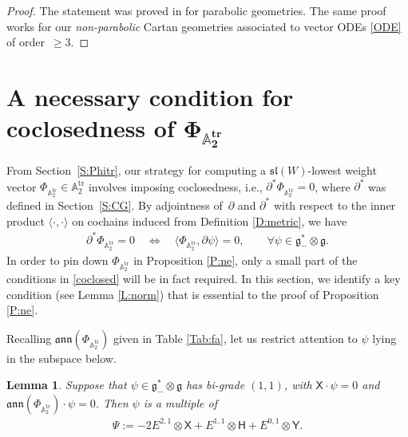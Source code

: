 \documentclass[10pt,a4paper]{amsart}
\newcommand\tensor{\otimes}
\DeclareMathOperator{\tr}{tr}
\newcommand{\g}{\mathfrak{g}}
\newcommand\fann{\mathfrak{ann}}
\newcommand\fg{\mathfrak{g}}
\newcommand\fsl{\mathfrak{sl}}
\newcommand\bbA{\mathbb{A}}
\newcommand\sfX{\mathsf{X}}
\newcommand\sfH{\mathsf{H}}
\newcommand\sfY{\mathsf{Y}}
\numberwithin{equation}{section}
\newtheorem{Lemma}[Theorem]{Lemma}
\begin{document}
\begin{proof}
The statement was proved in \cite[Theorem~3.1.12]{CS2009} for parabolic geometries. The same proof works for our {\em non-parabolic} Cartan geometries associated to vector ODEs \eqref{ODE} of order~${\ge 3}$.
\end{proof}

\section[A necessary condition for coclosedness of Phi\_\{A\_2\^{}\{tr\}\}]{A necessary condition for coclosedness of $\boldsymbol{\Phi_{\bbA_2^{\tr}}}$}\label{S:coclosed}

 From Section~\ref{S:Phitr}, our strategy for computing a $\fsl(W)$-lowest weight vector $\Phi_{\bbA_2^{\tr}} \in \bbA_2^{\tr}$ involves imposing coclosedness, i.e., $\partial^* \Phi_{\bbA_2^{\tr}} = 0$, where $\partial^*$ was defined in Section~\ref{S:CG}. By adjointness of~$\partial$ and $\partial^*$ with respect to the inner product $\langle \cdot, \cdot \rangle$ on cochains induced from Definition \ref{D:metric}, we have
\begin{align}\label{coclosed}
\partial^\ast \Phi_{\bbA_2^{\tr}} = 0 \quad \iff \quad \big\langle \Phi_{\bbA_2^{\tr}},
\partial \psi \big\rangle = 0, \qquad \forall \psi \in \g^*_- \tensor \g.
\end{align}
 In order to pin down $\Phi_{\bbA_2^{\tr}}$ in Proposition \ref{P:ne}, only a small part of the conditions in \eqref{coclosed} will be in fact required. In this section, we identify a key condition (see Lemma \ref{L:norm}) that is essential to the proof of Proposition \ref{P:ne}.

 Recalling
$\fann(\Phi_{\bbA_2^{\tr}})$ given in Table \ref{Tab:fa}, let us restrict attention to $\psi$ lying in the subspace below.

\begin{Lemma} \label{L:1-cochain}
Suppose that $\psi \in \fg_-^* \otimes \fg$ has bi-grade $(1,1)$, with $\sfX \cdot \psi = 0$ and $\fann(\Phi_{\bbA_2^{\tr}}) \cdot \psi = 0$. Then $\psi$ is a multiple of
\begin{align} \label{E:Psi}
\Psi:= -2E^{2,1} \tensor \sfX + E^{1,1} \tensor \sfH + E^{0,1} \tensor \sfY.
\end{align}
\end{Lemma}
\end{document}
